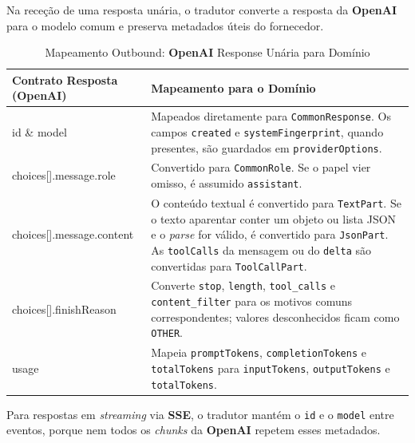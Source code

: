     Na receção de uma resposta unária, o tradutor converte a resposta da \textbf{OpenAI} para o modelo comum e preserva metadados úteis do fornecedor.

    \begin{table}[H]
        \centering
        \footnotesize
        \renewcommand{\arraystretch}{1.25}
        \begin{tabularx}{\textwidth}{|>{\ttfamily\raggedright\arraybackslash}p{4cm}|Y|}
            \hline
            \textbf{Contrato Resposta (OpenAI)} & \textbf{Mapeamento para o Domínio} \\
            \hline
            id \& model & Mapeados diretamente para \texttt{CommonResponse}. Os campos \texttt{created} e \texttt{systemFingerprint}, quando presentes, são guardados em \texttt{providerOptions}. \\
            \hline
            choices[].message.role & Convertido para \texttt{CommonRole}. Se o papel vier omisso, é assumido \texttt{assistant}. \\
            \hline
            choices[].message.content & O conteúdo textual é convertido para \texttt{TextPart}. Se o texto aparentar conter um objeto ou lista JSON e o \textit{parse} for válido, é convertido para \texttt{JsonPart}. As \texttt{toolCalls} da mensagem ou do \texttt{delta} são convertidas para \texttt{ToolCallPart}. \\
            \hline
            choices[].finishReason & Converte \texttt{stop}, \texttt{length}, \texttt{tool\_calls} e \texttt{content\_filter} para os motivos comuns correspondentes; valores desconhecidos ficam como \texttt{OTHER}. \\
            \hline
            usage & Mapeia \texttt{promptTokens}, \texttt{completionTokens} e \texttt{totalTokens} para \texttt{inputTokens}, \texttt{outputTokens} e \texttt{totalTokens}. \\
            \hline
        \end{tabularx}
        \caption{Mapeamento Outbound: \textbf{OpenAI} Response Unária para Domínio}
    \end{table}

    Para respostas em \textit{streaming} via \textbf{SSE}, o tradutor mantém o \texttt{id} e o \texttt{model} entre eventos, porque nem todos os \textit{chunks} da \textbf{OpenAI} repetem esses metadados.

